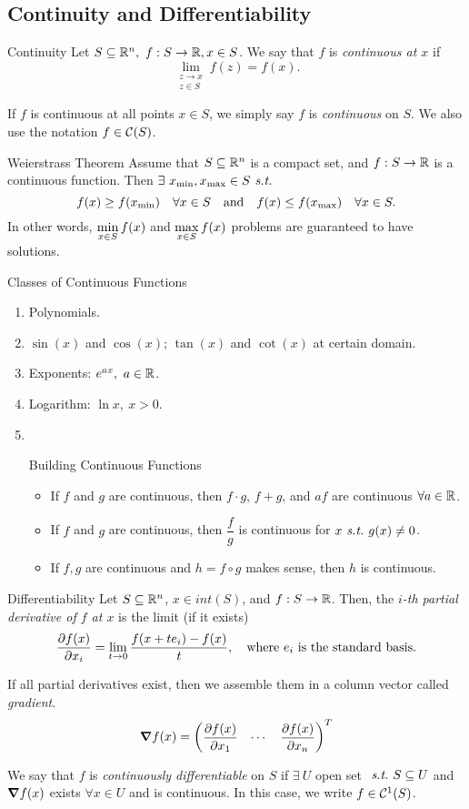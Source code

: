 \subsection{Continuity and Differentiability}
\begin{df}{Continuity}
	Let $S\subseteq{\mathbb{R}}^n,\ f:S\to{\mathbb{R}}, x\in S$. We say that $f$ is \textit{continuous at $x$} if \[\lim_{\substack{z\to x\\ z\in S}} f(z) = f(x).\]\par	 If $f$ is continuous at all points $x\in S$, we simply say $f$ is \textit{continuous} on $S$. We also use the notation $f\in{\mathcal{C}}(S)$.
\end{df}
\begin{thm}{Weierstrass Theorem}
	Assume that $S\subseteq{\mathbb{R}}^n$ is a compact set, and $f: S\to{\mathbb{R}}$ is a continuous function. Then $\exists\ x_{\min}, x_{\max}\in S\emph{\ s.t.\ }$ \[f(x)\geq f\qty(x_{\min})\quad\forall x\in S\quad\text{and}\quad f(x)\leq f\qty(x_{\max})\quad\forall x\in S.\] In other words, $\displaystyle\min_{x\in S}f(x)$ and $\displaystyle\max_{x\in S}f(x)$ problems are guaranteed to have solutions.
\end{thm}
\begin{eg}{Classes of Continuous Functions}
	\begin{enumerate}
		\item Polynomials.
		\item $\sin(x)$ and $\cos(x)$; $\tan(x)$ and $\cot(x)$ at certain domain.
		\item Exponents: $e^{ax},\ a\in\R$.
		\item Logarithm: $\ln{x},\ x>0$.
		\item \ \par \begin{thm}{Building Continuous Functions} \begin{itemize}\item If $f$ and $g$ are continuous, then $f\cdot g$, $f+g$, and $af$ are continuous $\forall a\in{\mathbb{R}}$. \item If $f$ and $g$ are continuous, then $\dfrac{f}{g}$ is continuous for $x\emph{\ s.t.\ } g(x)\neq0$.\item If $f,g$ are continuous and $h=f\circ g$ makes sense, then $h$ is continuous. \end{itemize}\end{thm}
	\end{enumerate}
\end{eg}
\begin{df}{Differentiability}
	Let $S\subseteq{\mathbb{R}}^n$, $x\in int(S)$, and $f:S\to{\mathbb{R}}$. Then, the \textit{$i$-th partial derivative of $f$ at $x$} is the limit (if it exists) \[\pdv{f(x)}{x_i}=\lim_{t\to0}\dfrac{f(x+te_i)-f(x)}{t},\quad\text{where }e_i\text{ is the standard basis}.\]\par If all partial derivatives exist, then we assemble them in a column vector called \textit{gradient}. \[\grad{f(x)}=\mqty(\dsst\pdv{f(x)}{x_1}&\cdots&\dsst\pdv{f(x)}{x_n})^T\]\par We say that $f$ is \textit{continuously differentiable} on $S$ if $\exists\ U$ open set $\emph{\ s.t.\ } S\subseteq U$ and $\grad{f(x)}$ exists $\forall x\in U$ and is continuous. In this case, we write $f\in{\mathcal{C}}^1(S)$.
\end{df}
